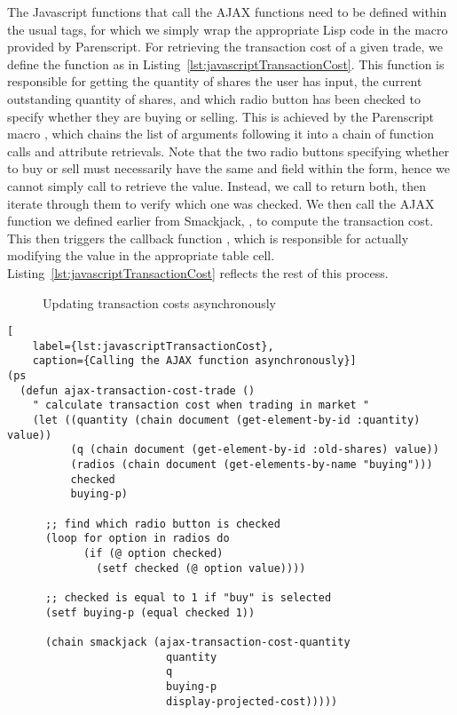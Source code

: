 The Javascript functions that call the AJAX functions need to be defined within
the usual  tags, for which we simply wrap the appropriate Lisp
code in the  macro provided by Parenscript. For retrieving
the transaction cost of a given trade, we define the function
 as in
Listing~\ref{lst:javascriptTransactionCost}. This function is responsible for
getting the quantity of shares the user has input, the current outstanding
quantity of shares, and which radio button has been checked to specify whether
they are buying or selling. This is achieved by the Parenscript macro
, which chains the list of arguments following it into a chain of
function calls and attribute retrievals. Note that the two radio buttons
specifying whether to buy or sell must necessarily have the same  and
 field within the form, hence we cannot simply call
 to retrieve the value. Instead, we call
 to return both, then iterate through them to verify
which one was checked. We then call the AJAX function we defined earlier from
Smackjack, , to compute the transaction
cost. This then triggers the callback function ,
which is responsible for actually modifying the value in the appropriate table
cell. Listing~\ref{lst:javascriptTransactionCost} reflects the rest of this
process.

\begin{figure}[htp]

	\caption{Updating transaction costs asynchronously}
\end{figure}

\begin{lstlisting}[
	label={lst:javascriptTransactionCost},
	caption={Calling the AJAX function asynchronously}]
(ps
  (defun ajax-transaction-cost-trade ()
	" calculate transaction cost when trading in market "
	(let ((quantity (chain document (get-element-by-id :quantity) value))
		  (q (chain document (get-element-by-id :old-shares) value))
		  (radios (chain document (get-elements-by-name "buying")))
		  checked
		  buying-p)

	  ;; find which radio button is checked
	  (loop for option in radios do
			(if (@ option checked)
			  (setf checked (@ option value))))

	  ;; checked is equal to 1 if "buy" is selected
	  (setf buying-p (equal checked 1))

	  (chain smackjack (ajax-transaction-cost-quantity
						 quantity
						 q
						 buying-p
						 display-projected-cost)))))
\end{lstlisting}

